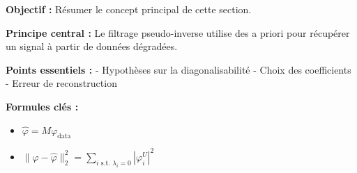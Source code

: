 \documentclass[12pt]{article}
\begin{document}
\begin{tcolorbox}[colback=red!5!white, colframe=red!75!black, title={\faBookmark\hspace{0.5em}Fiche Récapitulative}]
\textbf{Objectif :} Résumer le concept principal de cette section.

\textbf{Principe central :} Le filtrage pseudo-inverse utilise des a priori pour récupérer un signal à partir de données dégradées.

\vspace{0.4em}
\textbf{Points essentiels :}  
- Hypothèses sur la diagonalisabilité
- Choix des coefficients
- Erreur de reconstruction

\vspace{0.4em}
\textbf{Formules clés :}  
\begin{itemize}
\item $\hat{\varphi} = M\varphi_{\text{data}}$
\item $\|\varphi - \hat{\varphi}\|_2^2 = \sum_{i \text{ s.t. } \lambda_i = 0} |\varphi_i^U|^2$
\end{itemize}
\end{tcolorbox}
\end{document}
